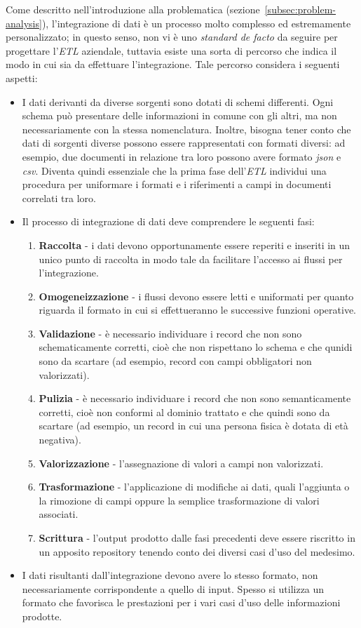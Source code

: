 Come descritto nell'introduzione alla problematica (sezione~\ref{subsec:problem-analysis}), l'integrazione di dati è un processo molto complesso ed estremamente personalizzato;
in questo senso, non vi è uno \textit{standard de facto} da seguire per progettare l'\textit{ETL} aziendale, tuttavia esiste una sorta di percorso che indica il modo in cui sia da effettuare l'integrazione.
Tale percorso considera i seguenti aspetti:
\begin{itemize}
    \item I dati derivanti da diverse sorgenti sono dotati di schemi differenti.
    Ogni schema può presentare delle informazioni in comune con gli altri, ma non necessariamente con la stessa nomenclatura.
    Inoltre, bisogna tener conto che dati di sorgenti diverse possono essere rappresentati con formati diversi:
    ad esempio, due documenti in relazione tra loro possono avere formato \textit{json} e \textit{csv}.
    Diventa quindi essenziale che la prima fase dell'\textit{ETL} individui una procedura per uniformare i formati e i riferimenti a campi in documenti correlati tra loro.
    \item Il processo di integrazione di dati deve comprendere le seguenti fasi:
    \begin{enumerate}
        \item \textbf{Raccolta} - i dati devono opportunamente essere reperiti e inseriti in un unico punto di raccolta in modo tale da facilitare l'accesso ai flussi per l'integrazione.
        \item \textbf{Omogeneizzazione} - i flussi devono essere letti e uniformati per quanto riguarda il formato in cui si effettueranno le successive funzioni operative.
        \item \textbf{Validazione} - è necessario individuare i record che non sono schematicamente corretti, cioè che non rispettano lo schema e che qunidi sono da scartare (ad esempio, record con campi obbligatori non valorizzati).
        \item \textbf{Pulizia} - è necessario individuare i record che non sono semanticamente corretti, cioè non conformi al dominio trattato e che quindi sono da scartare (ad esempio, un record in cui una persona fisica è dotata di età negativa).
        \item \textbf{Valorizzazione} - l'assegnazione di valori a campi non valorizzati.
        \item \textbf{Trasformazione} - l'applicazione di modifiche ai dati, quali l'aggiunta o la rimozione di campi oppure la semplice trasformazione di valori associati.
        \item \textbf{Scrittura} - l'output prodotto dalle fasi precedenti deve essere riscritto in un apposito repository tenendo conto dei diversi casi d'uso del medesimo.
    \end{enumerate}
    \item I dati risultanti dall'integrazione devono avere lo stesso formato, non necessariamente corrispondente a quello di input.
    Spesso si utilizza un formato che favorisca le prestazioni per i vari casi d'uso delle informazioni prodotte.
\end{itemize}

